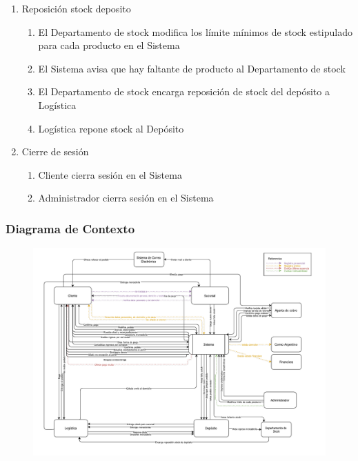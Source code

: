 \begin{enumerate}
\item Reposición stock deposito
  \begin{enumerate}
    \item El Departamento de stock modifica los límite mínimos de stock estipulado para cada producto en el Sistema \label{itm:f-deptostock-limite-stock-sistema}
    \item El Sistema avisa que hay faltante de producto al Departamento de stock \label{itm:f-sistema-falta-producto-deptostock}
    \item El Departamento de stock encarga reposición de stock del depósito a Logística \label{itm:f-deptostock-encarga-stock-logistica}
    \item Logística repone stock al Depósito \label{itm:f-logistica-repone-stock-deposito}
  \end{enumerate}

\item Cierre de sesión
  \begin{enumerate}
    \item Cliente cierra sesión en el Sistema \label{itm:f-cliente-cierra-sesion-sistema}
    \item Administrador	cierra sesión en el Sistema \label{itm:f-administrador-cierra-sesion-sistema}
  \end{enumerate}
\end{enumerate}
\clearpage

\subsubsection{Diagrama de Contexto}

\begin{figure}[H]
  \begin{center}
  \includegraphics[height=0.65\textheight,angle=90]{tp1/images/contexto.pdf}
  \end{center}
\end{figure}
